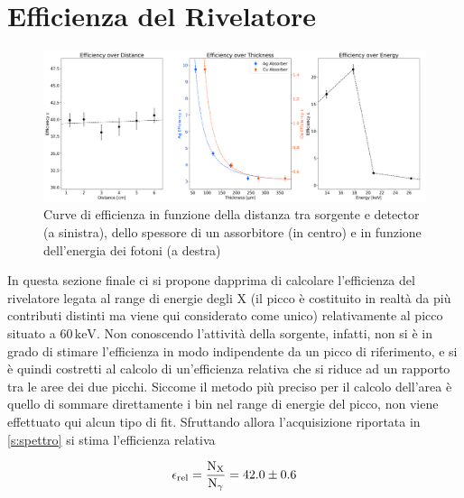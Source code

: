 \documentclass[twocolumn,10pt]{asme2ej}
\begin{document}
\vspace{-10pt}
\section{Efficienza del Rivelatore}\label{s:efficienza}

\begin{figure}[t]
    \centering
    \includegraphics[width=\textwidth]{../Plots/efficiency.png}
   \caption{Curve di efficienza in funzione della distanza tra sorgente e detector (a sinistra), dello spessore di un
            assorbitore (in centro) e in funzione dell'energia dei fotoni (a destra)}
    \label{i:efficiency}
\end{figure}

In questa sezione finale ci si propone dapprima di calcolare l'efficienza del rivelatore legata al range di energie
degli X (il picco è costituito in realtà da più contributi distinti ma viene qui considerato come unico) relativamente
al picco situato a $60\,\si{\kilo\electronvolt}$. Non conoscendo l'attività della sorgente, infatti, non si è in grado
di stimare l'efficienza in modo indipendente da un picco di riferimento, e si è quindi costretti al calcolo di
un'efficienza relativa che si riduce ad un rapporto tra le aree dei due picchi. Siccome il metodo più preciso per il
calcolo dell'area è quello di sommare direttamente i bin nel range di energie del picco, non viene effettuato qui alcun
tipo di fit. Sfruttando allora l'acquisizione riportata in \autoref{s:spettro} si stima l'efficienza relativa

\vspace{-15pt}
\begin{equation}\label{e:efficienza}
    \epsilon_{\text{rel}} = \frac{\text{N}_{\text{X}}}{\text{N}_{\gamma}} = 42.0 \pm 0.6
    \vspace{-5pt}
\end{equation}
\end{document}
